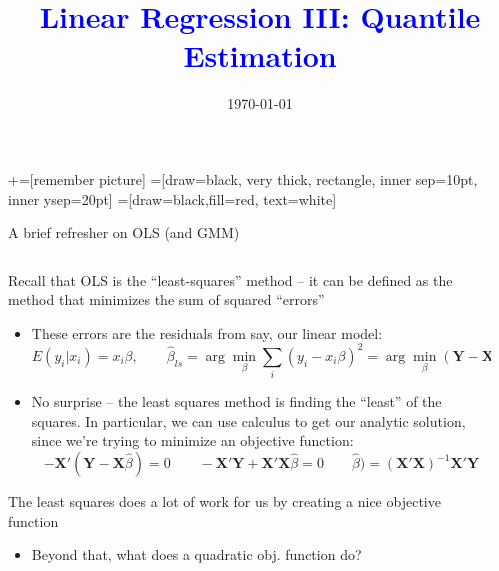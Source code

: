 \documentclass[notes,11pt, aspectratio=169]{beamer}
\title[]{\textcolor{blue}{Linear Regression III: Quantile Estimation}}
\author[PGP]{}
\institute[FRBNY]{\small{Paul Goldsmith-Pinkham}}
\date{\today}
\newenvironment{wideitemize}{\itemize\addtolength{\itemsep}{10pt}}{\enditemize}
\begin{document}
\newcommand\marktopleft[1]{%
    \tikz[overlay,remember picture] 
        \node (marker-#1-a) at (-.3em,.3em) {};%
}
\newcommand\markbottomright[2]{%
    \tikz[overlay,remember picture] 
        \node (marker-#1-b) at (0em,0em) {};%
}
+=[remember picture] 
 =[draw=black, very thick, rectangle, inner sep=10pt, inner ysep=20pt]
 =[draw=black,fill=red, text=white]

\begin{frame}
\maketitle

\end{frame}


\begin{frame}{A brief refresher on OLS (and GMM)}
  \begin{columns}[T] %
\begin{column}{.8\textwidth}
  \begin{wideitemize}
  \item Recall that OLS is the ``least-squares'' method -- it can be
    defined as the method that minimizes the sum of squared ``errors''
    \begin{itemize}
    \item These errors are the residuals from say, our linear model:
      $$E(y_{i}|x_{i}) = x_{i}\beta, \qquad \hat{\beta}_{ls} = \arg\min_{\beta} \sum_{i} (y_{i} - x_{i}\beta)^{2} = \arg\min_{\beta} (\mathbf{Y} - \mathbf{X}\beta)'(\mathbf{Y} - \mathbf{X}\beta) $$
    \item No surprise -- the least squares method is finding the ``least'' of the squares. In particular, we can use calculus to get our analytic solution, since we're trying to minimize an objective function:
$$ -\mathbf{X}'(\mathbf{Y} - \mathbf{X}\hat{\beta})  = 0 \qquad  -\mathbf{X}'\mathbf{Y}  + \mathbf{X}'\mathbf{X}\hat{\beta}  = 0 \qquad  \hat{\beta})  = (\mathbf{X}'\mathbf{X})^{-1}\mathbf{X}'\mathbf{Y} $$
\end{itemize}
\item The least squares does a lot of work for us by creating a nice
  objective function
  \begin{itemize}
  \item Beyond that, what does a quadratic obj. function do?
  \end{itemize}
  \end{wideitemize}
  \end{column}%
  \hfill%
  \begin{column}{.5\textwidth}
  \end{column}
\end{columns}
\end{frame}
\end{document}
